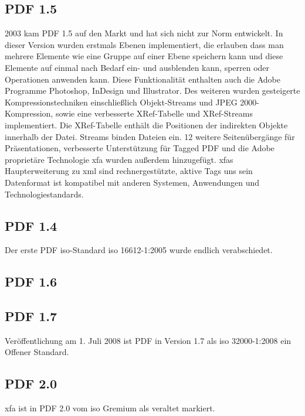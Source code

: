 \subsection{PDF 1.5}
2003 kam PDF 1.5 auf den Markt und hat sich nicht zur Norm entwickelt. In dieser Version wurden erstmals Ebenen implementiert, die erlauben dass man mehrere Elemente wie eine Gruppe auf einer Ebene speichern kann und diese Elemente auf einmal nach Bedarf ein- und ausblenden kann, sperren oder Operationen anwenden kann. Diese Funktionalität enthalten auch die Adobe Programme Photoshop, InDesign und Illustrator. Des weiteren wurden gesteigerte Kompressionstechniken einschließlich Objekt-Streams und JPEG 2000-Kompression, sowie eine verbesserte XRef-Tabelle und XRef-Streams implementiert.
Die XRef-Tabelle enthält die Positionen der indirekten Objekte innerhalb der Datei. Streams binden Dateien ein. 12 weitere Seitenübergänge für Präsentationen, verbesserte Unterstützung für Tagged PDF und die Adobe proprietäre Technologie \gls{xfa} wurden außerdem hinzugefügt. \cite{proj-consult} \gls{xfa}s Haupterweiterung zu \gls{xml} sind rechnergestützte, aktive Tags uns sein Datenformat ist kompatibel mit anderen Systemen, Anwendungen und Technologiestandards. \cite{wiki-xfa}

\subsection{PDF 1.4}
Der erste PDF \gls{iso}-Standard \gls{iso} 16612-1:2005 wurde endlich verabschiedet.

\subsection{PDF 1.6}

\subsection{PDF 1.7}
Veröffentlichung am 1. Juli 2008 ist PDF in Version 1.7 als \gls{iso} 32000-1:2008 ein Offener Standard.

\subsection{PDF 2.0}
\gls{xfa} ist in PDF 2.0 vom \gls{iso} Gremium als veraltet markiert.